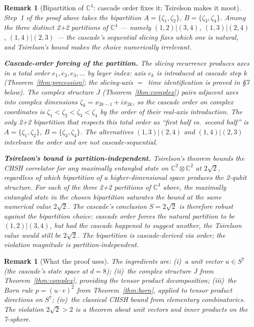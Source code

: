 \documentclass[12pt,a4paper]{article}
\newtheorem{remark}[theorem]{Remark}
\begin{document}
\begin{remark}[Bipartition of $\mathbb{C}^4$: cascade order fixes it; Tsirelson makes it moot]\label{rem:sp17-status}
Step~1 of the proof above takes the bipartition
$A = \{\zeta_1,\zeta_2\}$, $B = \{\zeta_3,\zeta_4\}$. Among the three
distinct 2+2 partitions of $\mathbb{C}^4$ --- namely
$(1,2)|(3,4)$, $(1,3)|(2,4)$, $(1,4)|(2,3)$ --- the cascade's
sequential slicing fixes which one is natural, and Tsirelson's bound
makes the choice numerically irrelevant.

\medskip\noindent\textbf{Cascade-order forcing of the partition.}
The slicing recurrence produces axes in a \emph{total order}
$e_1, e_2, e_3, \ldots$ by layer index: axis $e_k$ is introduced at
cascade step $k$ (Theorem~\ref{thm:precession}; the slicing-axis
$=$~time identification is proved in \S7 below). The complex structure
$J$ (Theorem~\ref{thm:complex}) pairs adjacent axes into complex
dimensions $\zeta_k = x_{2k-1} + ix_{2k}$, so the cascade order on
complex coordinates is $\zeta_1 < \zeta_2 < \zeta_3 < \zeta_4$ by
the order of their real-axis introduction. The only 2+2 bipartition
that respects this total order as ``first half vs.\ second half'' is
$A = \{\zeta_1,\zeta_2\}$, $B = \{\zeta_3,\zeta_4\}$. The
alternatives $(1,3)|(2,4)$ and $(1,4)|(2,3)$ interleave the order
and are not cascade-sequential.

\medskip\noindent\textbf{Tsirelson's bound is partition-independent.}
Tsirelson's theorem bounds the CHSH correlator for any maximally
entangled state on $\mathbb{C}^2\otimes\mathbb{C}^2$ at $2\sqrt{2}$,
regardless of which bipartition of a higher-dimensional space
produces the 2-qubit structure. For each of the three 2+2 partitions
of $\mathbb{C}^4$ above, the maximally entangled state in the chosen
bipartition saturates the bound at the same numerical value
$2\sqrt{2}$. The cascade's conclusion $S = 2\sqrt{2}$ is therefore
robust against the bipartition choice: cascade order forces the
natural partition to be $(1,2)|(3,4)$, but had the cascade happened
to suggest another, the Tsirelson value would still be $2\sqrt{2}$.
The bipartition is cascade-derived via order; the violation magnitude
is partition-independent.
\end{remark}

\begin{remark}[What the proof uses]
The ingredients are: (i)~a unit vector $u\in S^7$ (the cascade's state space at $d=8$);
(ii)~the complex structure $J$ from Theorem~\ref{thm:complex}, providing the tensor product
decomposition; (iii)~the Born rule $p=(u\cdot v)^2$ from Theorem~\ref{thm:born}, applied to
tensor product directions on $S^7$; (iv)~the classical CHSH bound from elementary
combinatorics. The violation $2\sqrt{2}>2$ is a theorem about unit vectors and inner products
on the 7-sphere.
\end{remark}
\end{document}
